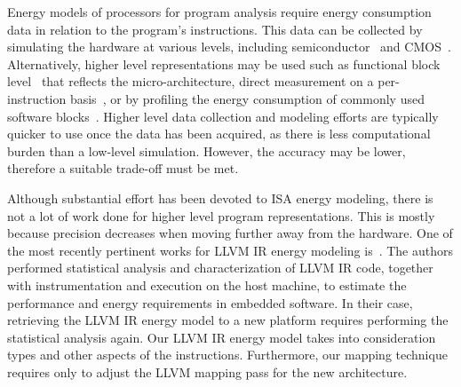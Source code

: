 \documentclass[9pt,preprint]{sigplanconf}
\begin{document}
Energy models of processors for program analysis require energy consumption data
in relation to the program's instructions. This data can be collected by
simulating the hardware at various levels, including
semiconductor~\cite{Nagel:M520} and CMOS~\cite{Bogliolo1997}.  Alternatively,
higher level representations may be used such as functional block
level~\cite{Steinke2001} that reflects the micro-architecture, direct
measurement on a per-instruction basis~\cite{Tiwari-embedded-1994}, or by
profiling the energy consumption of commonly used software
blocks~\cite{Qu-Function-level-2000}. Higher level data collection and modeling
efforts are typically quicker to use once the data has been acquired, as there
is less computational burden than a low-level simulation. However, the accuracy
may be lower, therefore a suitable trade-off must be met.


Although substantial effort has been devoted to ISA energy modeling, there is
not a lot of work done for higher level program representations. This is mostly
because precision decreases when moving further away from the hardware. One of
the most recently pertinent works for LLVM IR energy modeling is~\cite{Brandolese2011}.
The authors performed statistical analysis and characterization of LLVM IR code,
together with instrumentation and execution on the host machine, to estimate
the performance and energy requirements in embedded software. In their case,
retrieving the LLVM IR energy model to a new platform requires performing the
statistical analysis again. Our LLVM IR energy model takes into consideration
types and other aspects of the instructions. Furthermore, our mapping technique
requires only to adjust the LLVM mapping pass for the new architecture.
\end{document}
